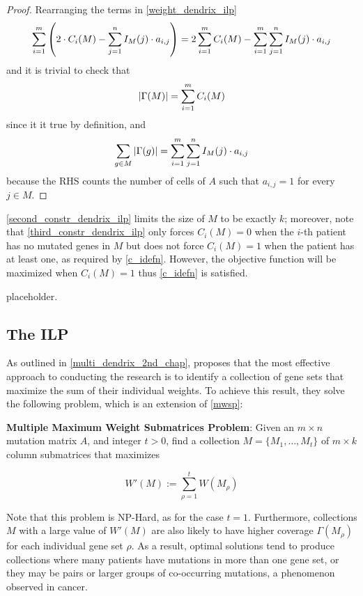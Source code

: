 \begin{proof}
    Rearranging the terms in \cref{weight_dendrix_ilp} $$\sum_{i = 1}^m {\left(2 \cdot C_i(M) - \sum_{j = 1}^n I_M(j) \cdot a_{i, j}\right)} = 2\sum_{i = 1}^m {C_i(M)} - \sum_{i = 1}^m {\sum_{j = 1}^n {I_M(j) \cdot a_{i, j}}}$$ and it is trivial to check that $$\left|\Gamma(M)\right| = \sum_{i = 1}^m {C_i(M)}$$ since it it true by definition, and $$\sum_{g \in M}{\left|\Gamma(g)\right|} = \sum_{i = 1}^m {\sum_{j = 1}^n {I_M(j) \cdot a_{i, j}}}$$ because the RHS counts the number of cells of $A$ such that $a_{i, j} = 1$ for every $j \in M$.
\end{proof}

\cref{second_constr_dendrix_ilp} limits the size of $M$ to be exactly $k$; moreover, note that \cref{third_constr_dendrix_ilp} only forces $C_i(M) = 0$ when the $i$-th patient has no mutated genes in $M$ but does not force $C_i(M) = 1$ when the patient has at least one, as required by \cref{c_idefn}. However, the objective function will be maximized when $C_i(M)=1$ thus \cref{c_idefn} is satisfied.

placeholder. 

\subsection{The ILP}

As outlined in \cref{multi_dendrix_2nd_chap}, \textcite{multi-dendrix} proposes that the most effective approach to conducting the research is to identify a collection of gene sets that maximize the sum of their individual weights. To achieve this result, they solve the following problem, which is an extension of \cref{mwsp}:

\begin{displayquote}
    \textbf{Multiple Maximum Weight Submatrices Problem}: Given an $m \times n$ mutation matrix $A$, and integer $t > 0$, find a collection $M = \{M_1, \ldots, M_t\}$ of $m \times k$  column submatrices that maximizes

    \begin{equation}
        W'(M) := \sum_{\rho = 1}^t {W(M_\rho)}
    \end{equation}
\end{displayquote}

Note that this problem is NP-Hard, as for the case $t = 1$. Furthermore, collections $M$ with a large value of $W'(M)$ are also likely to have higher coverage $\Gamma(M_\rho)$ for each individual gene set $\rho$. As a result, optimal solutions tend to produce collections where many patients have mutations in more than one gene set, or they may be pairs or larger groups of co-occurring mutations, a phenomenon observed in cancer. 


